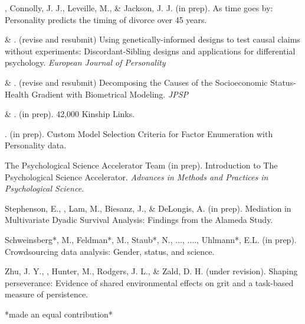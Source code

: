 
\item\meb, Connolly, J. J., Leveille, M., \& Jackson, J. J. (in prep). As time goes by: Personality predicts the timing of divorce over 45 years.%
\item \meb \& \joe. (revise and resubmit) Using genetically-informed designs to test causal claims without experiments: Discordant-Sibling designs and applications for differential psychology. \textit{European Journal of Personality}  \href{https://osf.io/zpdwt/}{\color{blue}{https://osf.io/zpdwt/}}
\item \meb \& \joe.  (revise and resubmit) Decomposing the Causes of the Socioeconomic Status-Health Gradient with Biometrical Modeling.  \textit{JPSP} \href{https://osf.io/vd2kc/}{\color{blue}{https://osf.io/vd2kc/}}
\item \meb \& \joe.  (in prep). 42,000 Kinship Links.
\item \meb. (in prep). Custom Model Selection Criteria for Factor Enumeration with Personality data.
\item The Psychological Science Accelerator Team (in prep). Introduction to The Psychological Science Accelerator. \textit{Advances in Methods and Practices in Psychological Science.}
\item Stephenson, E., \meb, Lam, M., Biesanz, J., \& DeLongis, A. (in prep). Mediation in Multivariate Dyadic Survival Analysis: Findings from the Alameda Study. %
\item Schweinsberg*, M., Feldman*, M., Staub*, N., ..., \meb ...., Uhlmann*, E.L. (in prep). Crowdsourcing data analysis: Gender, status, and science. 
\item Zhu, J. Y., \meb, Hunter, M., Rodgers, J. L., \& Zald, D. H. (under revision). Shaping perseverance: Evidence of shared environmental effects on grit and a task-based measure of persistence. %
\vspace{-2mm}\begin{center}\footnotesize{*made an equal contribution*}\end{center} \vspace{-3mm}
\vspace{-2mm}\begin{center}\end{center} \vspace{-4mm}
